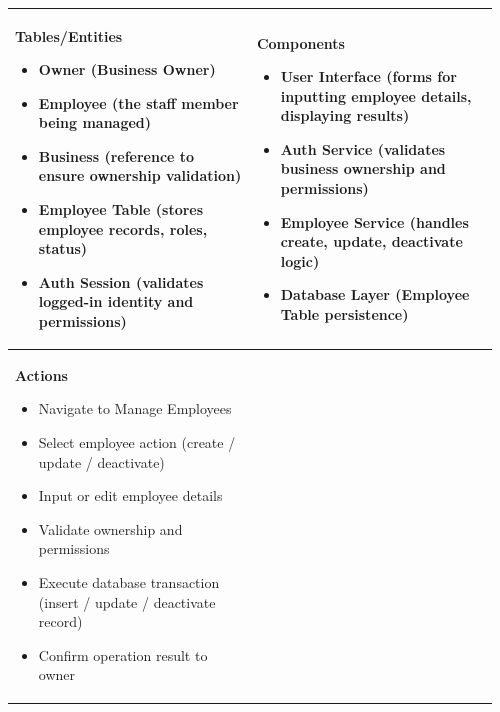 \documentclass[]{VUMIFTemplateClass}
\newenvironment{mpitemlist}[1][\linewidth]{%
    \begin{minipage}[t]{#1}%
        \setlength{\leftmargini}{12pt}%
        \begin{itemize}%
            \setlength{\itemsep}{1pt}%
            \setlength{\parskip}{0pt}%
            \setlength{\parsep}{0pt}%
}{%
        \end{itemize}%
    \end{minipage}\newline
}
\begin{document}
\begin{center}
\setlength{\tabcolsep}{8pt}
\begin{tabular}{|p{0.48\linewidth}|p{0.48\linewidth}|}
\hline
\textbf{Tables/Entities} \newline
\begin{mpitemlist}
\item Owner (Business Owner)
\item Employee (the staff member being managed)
\item Business (reference to ensure ownership validation)
\item Employee Table (stores employee records, roles, status)
\item Auth Session (validates logged-in identity and permissions)
\end{mpitemlist}
&
\textbf{Components} \newline
\begin{mpitemlist}
\item User Interface (forms for inputting employee details, displaying results)
\item Auth Service (validates business ownership and permissions)
\item Employee Service (handles create, update, deactivate logic)
\item Database Layer (Employee Table persistence)
\end{mpitemlist}
\\ \hline
\textbf{Actions} \newline
\begin{mpitemlist}
\item Navigate to Manage Employees
\item Select employee action (create / update / deactivate)
\item Input or edit employee details
\item Validate ownership and permissions
\item Execute database transaction (insert / update / deactivate record)
\item Confirm operation result to owner
\end{mpitemlist}
&

\\ \hline
\end{tabular}
\end{center}
\end{document}
